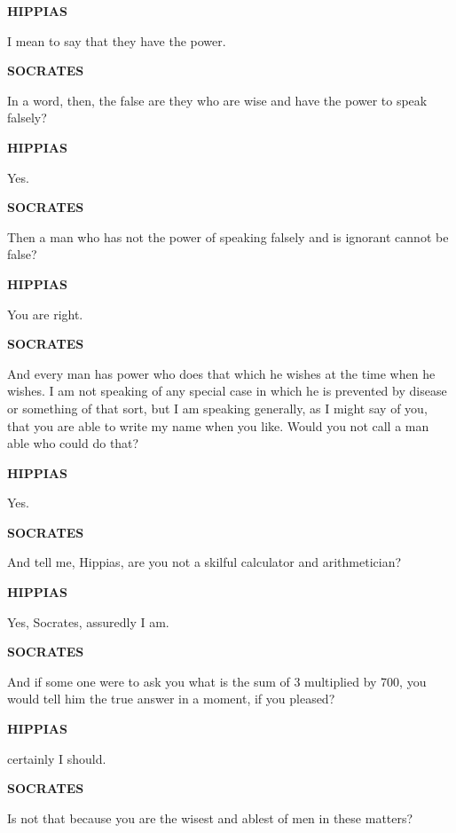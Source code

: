 \documentclass[11pt,letter]{article}
\begin{document}
\par \textbf{HIPPIAS}
\par   I mean to say that they have the power.

\par \textbf{SOCRATES}
\par   In a word, then, the false are they who are wise and have the power to speak falsely?

\par \textbf{HIPPIAS}
\par   Yes.

\par \textbf{SOCRATES}
\par   Then a man who has not the power of speaking falsely and is ignorant cannot be false?

\par \textbf{HIPPIAS}
\par   You are right.

\par \textbf{SOCRATES}
\par   And every man has power who does that which he wishes at the time when he wishes. I am not speaking of any special case in which he is prevented by disease or something of that sort, but I am speaking generally, as I might say of you, that you are able to write my name when you like. Would you not call a man able who could do that?

\par \textbf{HIPPIAS}
\par   Yes.

\par \textbf{SOCRATES}
\par   And tell me, Hippias, are you not a skilful calculator and arithmetician?

\par \textbf{HIPPIAS}
\par   Yes, Socrates, assuredly I am.

\par \textbf{SOCRATES}
\par   And if some one were to ask you what is the sum of 3 multiplied by 700, you would tell him the true answer in a moment, if you pleased?

\par \textbf{HIPPIAS}
\par   certainly I should.

\par \textbf{SOCRATES}
\par   Is not that because you are the wisest and ablest of men in these matters?
\end{document}

